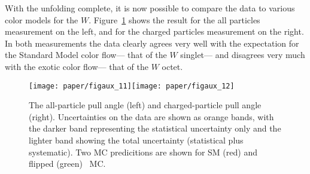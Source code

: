 With the unfolding complete, it is now possible to compare the data to various color models for the $W$. Figure~\ref{fig:color:unfolding:final} shows the result for the all particles measurement on the left, and for the charged particles measurement on the right. In both measurements the data clearly agrees very well with the expectation for the Standard Model color flow--- that of the $W$ singlet--- and disagrees very much with the exotic color flow--- that of the $W$ octet. 










\begin{figure}[h!]
\begin{center}
\texttt{[image: paper/figaux\_11]}\texttt{[image: paper/figaux\_12]}
 \caption{The all-particle pull angle (left) and charged-particle pull angle (right).
    Uncertainties on the data are shown as orange bands, with the darker band
    representing the statistical uncertainty only and the lighter band
    showing the total uncertainty (statistical plus systematic). Two MC predicitions
    are shown for SM (red) and flipped (green) \PowPythia\ MC.}
 \label{fig:color:unfolding:final}
  \end{center}
\end{figure}

